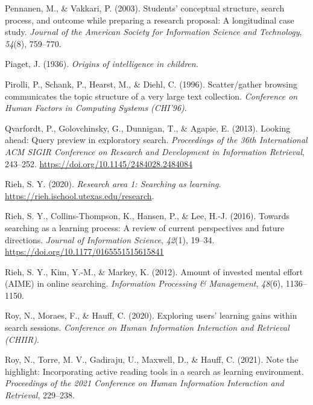 \documentclass[letterpaper, nobind]{templates/ociamthesis}
\newlength{\cslhangindent}
\newenvironment{CSLReferences}[2] %
 {%
  \setlength{\parindent}{0pt}
  \ifodd #1
  \let\oldpar\par
  \def\par{\hangindent=\cslhangindent\oldpar}
  \fi
  \setlength{\parskip}{1mm}
  \setlength{\baselineskip}{6mm}
 }%
 {}
\begin{document}
\begin{CSLReferences}{1}{0}
\leavevmode{}%
Pennanen, M., \& Vakkari, P. (2003). Students' conceptual structure, search process, and outcome while preparing a research proposal: A longitudinal case study. \emph{Journal of the American Society for Information Science and Technology}, \emph{54}(8), 759--770.

\leavevmode{}%
Piaget, J. (1936). \emph{Origins of intelligence in children.}

\leavevmode{}%
Pirolli, P., Schank, P., Hearst, M., \& Diehl, C. (1996). Scatter/gather browsing communicates the topic structure of a very large text collection. \emph{Conference on Human Factors in Computing Systems (CHI'96)}.

\leavevmode{}%
Qvarfordt, P., Golovchinsky, G., Dunnigan, T., \& Agapie, E. (2013). Looking ahead: {Query} preview in exploratory search. \emph{Proceedings of the 36th International {ACM SIGIR} Conference on Research and Development in Information Retrieval}, 243--252. \url{https://doi.org/10.1145/2484028.2484084}

\leavevmode{}%
Rieh, S. Y. (2020). \emph{Research area 1: Searching as learning}. \url{https://rieh.ischool.utexas.edu/research}.

\leavevmode{}%
Rieh, S. Y., Collins-Thompson, K., Hansen, P., \& Lee, H.-J. (2016). Towards searching as a learning process: A review of current perspectives and future directions. \emph{Journal of Information Science}, \emph{42}(1), 19--34. \url{https://doi.org/10.1177/0165551515615841}

\leavevmode{}%
Rieh, S. Y., Kim, Y.-M., \& Markey, K. (2012). Amount of invested mental effort (AIME) in online searching. \emph{Information Processing \& Management}, \emph{48}(6), 1136--1150.

\leavevmode{}%
Roy, N., Moraes, F., \& Hauff, C. (2020). Exploring users' learning gains within search sessions. \emph{Conference on Human Information Interaction and Retrieval (CHIIR)}.

\leavevmode{}%
Roy, N., Torre, M. V., Gadiraju, U., Maxwell, D., \& Hauff, C. (2021). Note the highlight: Incorporating active reading tools in a search as learning environment. \emph{Proceedings of the 2021 Conference on Human Information Interaction and Retrieval}, 229--238.


\end{CSLReferences}
\end{document}
